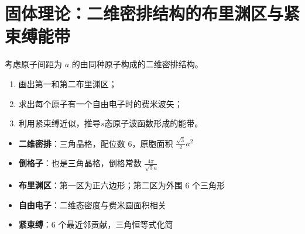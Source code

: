\section{固体理论：二维密排结构的布里渊区与紧束缚能带}
\label{sec:2d-triangular-lattice}

\begin{modelbox}
考虑原子间距为 $a$ 的由同种原子构成的二维密排结构。
\begin{enumerate}
    \item 画出第一和第二布里渊区；
    \item 求出每个原子有一个自由电子时的费米波矢；
    \item 利用紧束缚近似，推导$s$态原子波函数形成的能带。
\end{enumerate}
\end{modelbox}

\begin{tipbox}[考点快速分析]
\begin{itemize}
    \item \textbf{二维密排}：三角晶格，配位数 6，原胞面积 $\frac{\sqrt{3}}{2}a^2$
    \item \textbf{倒格子}：也是三角晶格，倒格常数 $\frac{4\pi}{\sqrt{3}a}$
    \item \textbf{布里渊区}：第一区为正六边形；第二区为外围 6 个三角形
    \item \textbf{自由电子}：二维态密度与费米圆面积相关
    \item \textbf{紧束缚}：6 个最近邻贡献，三角恒等式化简
\end{itemize}
\end{tipbox}

